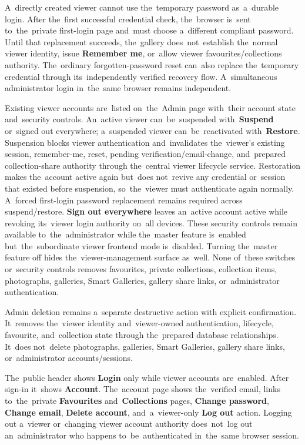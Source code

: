 \documentclass[11pt,a4paper]{article}
\newcommand{\ui}[1]{\textbf{#1}}
\begin{document}
A~directly created viewer cannot use the~temporary password as~a~durable login.
After the~first successful credential check, the~browser is~sent to~the~private
first-login page and~must choose a~different compliant password. Until that
replacement succeeds, the~gallery does~not~establish the~normal viewer identity,
issue \ui{Remember me}, or~allow viewer favourites/collections authority.
The~ordinary forgotten-password reset can~also replace the~temporary credential
through its~independently verified recovery flow. A~simultaneous administrator
login in~the~same browser remains independent.

Existing viewer accounts are~listed on~the~Admin page with~their account state
and~security controls. An~active viewer can~be~suspended with~\ui{Suspend}
or~signed out everywhere; a~suspended viewer can~be~reactivated
with~\ui{Restore}. Suspension blocks viewer authentication and~invalidates
the~viewer's existing session, remember-me, reset, pending
verification/email-change, and~prepared collection-share authority through
the~central viewer lifecycle service. Restoration makes the~account active again
but~does not~revive any credential or~session that existed before suspension,
so~the~viewer must authenticate again normally. A~forced first-login password
replacement remains required across suspend/restore. \ui{Sign out everywhere}
leaves an~active account active while revoking its~viewer login authority on~all
devices. These security controls remain available to~the~administrator while
the~master feature is~enabled but~the~subordinate viewer frontend mode
is~disabled. Turning the~master feature off hides the~viewer-management surface
as~well. None of~these switches or~security controls removes favourites, private
collections, collection items, photographs, galleries, Smart Galleries, gallery
share links, or~administrator authentication.

Admin deletion remains a~separate destructive action with explicit confirmation.
It~removes the~viewer identity and~viewer-owned authentication, lifecycle,
favourite, and~collection state through the~prepared database relationships.
It~does not~delete photographs, galleries, Smart Galleries, gallery share links,
or~administrator accounts/sessions.

The~public header shows \ui{Login} only while viewer accounts are~enabled. After
sign-in it~shows \ui{Account}. The~account page shows the~verified email, links
to~the~private \ui{Favourites} and~\ui{Collections} pages, \ui{Change password},
\ui{Change email}, \ui{Delete account}, and~a~viewer-only \ui{Log out} action.
Logging out a~viewer or~changing viewer account authority does~not~log out
an~administrator who happens to~be~authenticated in~the~same browser session.
\end{document}
